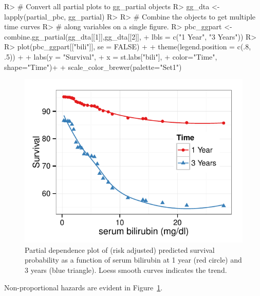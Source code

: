 \documentclass[nojss]{jss}
\begin{document}
\begin{Schunk}
\begin{Sinput}
R> # Convert all partial plots to gg_partial objects
R> gg_dta <- lapply(partial_pbc, gg_partial)
R> 
R> # Combine the objects to get multiple time curves 
R> # along variables on a single figure.
R> pbc_ggpart <- combine.gg_partial(gg_dta[[1]],gg_dta[[2]], 
+                                  lbls = c("1 Year", "3 Years"))
R> 
R> plot(pbc_ggpart[["bili"]], se = FALSE) + 
+   theme(legend.position = c(.8, .5)) + 
+   labs(y = "Survival", 
+        x = st.labs["bili"],
+        color="Time", shape="Time")+
+   scale_color_brewer(palette="Set1")
\end{Sinput}
\begin{figure}[!htpb]

{\centering \includegraphics[width=\maxwidth]{figure/rfs-pbc-partial-bili-1} 

}

\caption[Partial dependence plot of (risk adjusted) predicted survival probability as a function of serum bilirubin at 1 year (red circle) and 3 years (blue triangle)]{Partial dependence plot of (risk adjusted) predicted survival probability as a function of serum bilirubin at 1 year (red circle) and 3 years (blue triangle). Loess smooth curves indicates the trend.\label{fig:pbc-partial-bili}}
\end{figure}
\end{Schunk}

Non-proportional hazards are evident in Figure~\ref{fig:pbc-partial-bili}.
\end{document}
